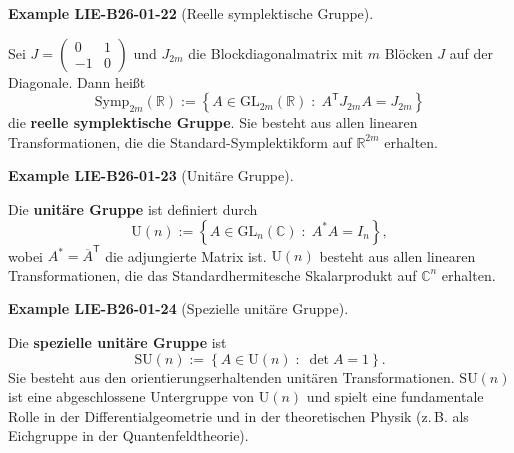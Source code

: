 \documentclass[10pt, letterpaper]{article}
\newcommand{\CustomHeading}[3]{%
  \par\medskip\noindent%
  \textbf{#1 #2} \textnormal{(#3)}.\enskip%
}
\newenvironment{EXA}[2]{\begin{unitbox}\CustomHeading{Example}{#1}{#2}}{\end{unitbox}}
\begin{document}
\begin{EXA}{LIE-B26-01-22}{Reelle symplektische Gruppe}
Sei $J = 
\begin{pmatrix}
0 & 1 \\[3pt]
-1 & 0
\end{pmatrix}$ 
und $J_{2m}$ die Blockdiagonalmatrix mit $m$ Blöcken $J$ auf der Diagonale.  
Dann heißt
\[
\mathrm{Symp}_{2m}(\mathbb{R})
:= \left\{ A \in \mathrm{GL}_{2m}(\mathbb{R}) \; : \; A^{\mathsf{T}} J_{2m} A = J_{2m} \right\}
\]
die \textbf{reelle symplektische Gruppe}.  
Sie besteht aus allen linearen Transformationen, die die Standard-Symplektikform auf $\mathbb{R}^{2m}$ erhalten.
\end{EXA}



\begin{EXA}{LIE-B26-01-23}{Unitäre Gruppe}
Die \textbf{unitäre Gruppe} ist definiert durch
\[
\mathrm{U}(n)
:= \left\{ A \in \mathrm{GL}_{n}(\mathbb{C}) \; : \; A^{*} A = I_{n} \right\},
\]
wobei $A^{*} = \overline{A}^{\mathsf{T}}$ die adjungierte Matrix ist.  
$\mathrm{U}(n)$ besteht aus allen linearen Transformationen, die das Standardhermitesche Skalarprodukt auf $\mathbb{C}^{n}$ erhalten.
\end{EXA}



\begin{EXA}{LIE-B26-01-24}{Spezielle unitäre Gruppe}
Die \textbf{spezielle unitäre Gruppe} ist
\[
\mathrm{SU}(n)
:= \left\{ A \in \mathrm{U}(n) \; : \; \det A = 1 \right\}.
\]
Sie besteht aus den orientierungserhaltenden unitären Transformationen.  
$\mathrm{SU}(n)$ ist eine abgeschlossene Untergruppe von $\mathrm{U}(n)$ und spielt eine fundamentale Rolle in der Differentialgeometrie und in der theoretischen Physik (z.\,B. als Eichgruppe in der Quantenfeldtheorie).
\end{EXA}
\end{document}
